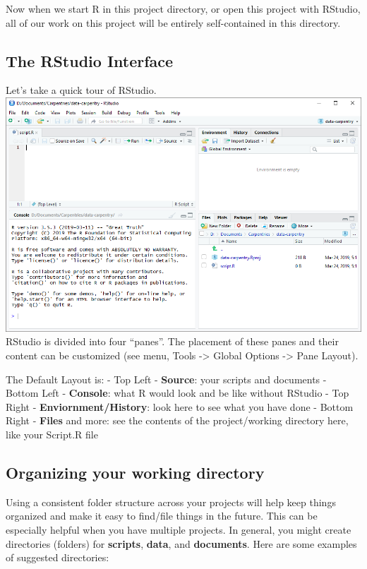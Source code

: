 \documentclass[]{book}
\begin{document}
Now when we start R in this project directory, or open this project with
RStudio, all of our work on this project will be entirely self-contained
in this directory.

\subsection{The RStudio Interface}\label{the-rstudio-interface}

Let's take a quick tour of RStudio.
\includegraphics{./fig/R_00_Rstudio_01.png} RStudio is divided into four
``panes''. The placement of these panes and their content can be
customized (see menu, Tools -\textgreater{} Global Options
-\textgreater{} Pane Layout).

The Default Layout is: - Top Left - \textbf{Source}: your scripts and
documents - Bottom Left - \textbf{Console}: what R would look and be
like without RStudio - Top Right - \textbf{Enviornment/History}: look
here to see what you have done - Bottom Right - \textbf{Files} and more:
see the contents of the project/working directory here, like your
Script.R file

\subsection{Organizing your working
directory}\label{organizing-your-working-directory}

Using a consistent folder structure across your projects will help keep
things organized and make it easy to find/file things in the future.
This can be especially helpful when you have multiple projects. In
general, you might create directories (folders) for \textbf{scripts},
\textbf{data}, and \textbf{documents}. Here are some examples of
suggested directories:
\end{document}
